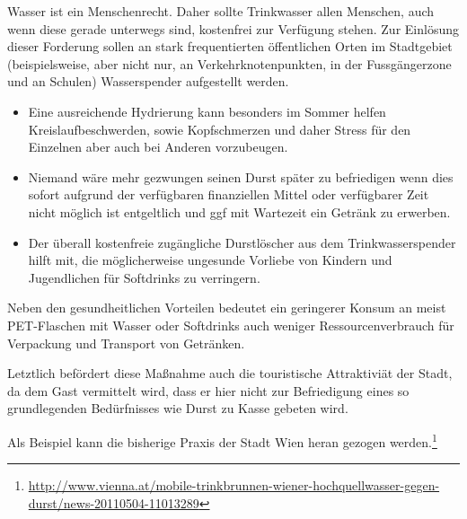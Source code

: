   Wasser ist ein Menschenrecht. Daher sollte Trinkwasser allen Menschen, auch 
  wenn diese gerade unterwegs sind, kostenfrei zur Verfügung stehen. Zur 
  Einlösung dieser Forderung sollen an stark frequentierten öffentlichen Orten 
  im Stadtgebiet (beispielsweise, aber nicht nur, an Verkehrknotenpunkten, in 
  der Fussgängerzone und an Schulen) Wasserspender aufgestellt werden.
    
  \begin{itemize}
    \item Eine ausreichende Hydrierung kann besonders im Sommer helfen 
          Kreislaufbeschwerden, sowie Kopfschmerzen und daher Stress für den 
          Einzelnen aber auch bei Anderen vorzubeugen.
    \item Niemand wäre mehr gezwungen seinen Durst später zu befriedigen wenn
          dies sofort aufgrund der verfügbaren finanziellen Mittel oder 
          verfügbarer Zeit nicht möglich ist entgeltlich und ggf mit Wartezeit 
          ein Getränk zu erwerben.
    \item Der überall kostenfreie zugängliche Durstlöscher aus dem 
          Trinkwasserspender hilft mit, die möglicherweise ungesunde Vorliebe 
          von Kindern und Jugendlichen für Softdrinks zu verringern. 
  \end{itemize}
  
  Neben den gesundheitlichen Vorteilen bedeutet ein geringerer Konsum an meist 
  PET-Flaschen mit Wasser oder Softdrinks auch weniger Ressourcenverbrauch für 
  Verpackung und Transport von Getränken.
  
  Letztlich befördert diese Maßnahme auch die touristische Attraktiviät der 
  Stadt, da dem Gast vermittelt wird, dass er hier nicht zur Befriedigung 
  eines so grundlegenden Bedürfnisses wie Durst zu Kasse gebeten wird.
  
  Als Beispiel kann die bisherige Praxis der Stadt Wien heran gezogen 
  werden.\footnote{\url{http://www.vienna.at/mobile-trinkbrunnen-wiener-hochquellwasser-gegen-durst/news-20110504-11013289}}
   